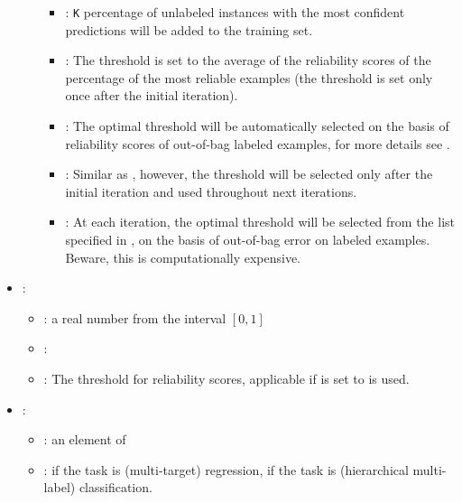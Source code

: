 \begin{itemize}
\begin{itemize}
\begin{itemize}
                    \item {}: {\tt K} percentage of unlabeled instances with the most confident predictions will be added to the training set.
                    \item {}: The threshold is set to the average of the reliability scores of the  percentage of the most reliable examples (the threshold is set only once after the initial iteration).
                    \item {}: The optimal threshold will be automatically selected on the basis of reliability scores of out-of-bag labeled examples, for more details see \cite{levatic2017_self-training}.
                    \item {}: Similar as , however, the threshold will be selected only after the initial iteration and used throughout next iterations.
                    \item {}: At each iteration, the optimal threshold will be selected from the list specified in , on the basis of out-of-bag error on labeled examples. Beware, this is computationally expensive. 
                \end{itemize}
           \end{itemize}
    \item {}:
           \begin{itemize}
                \item \optionPossibleValues{}: a real number from the interval $[0, 1]$
                \item \optionDefaultValue{}: 
                \item \optionDescrption{}: The threshold for reliability scores, applicable if  is set to  is used.
           \end{itemize}
    \item {}:
           \begin{itemize}
                \item \optionPossibleValues{}: an element of 
                \item \optionDefaultValue{}:  if the task is (multi-target) regression,  if the task is (hierarchical multi-label) classification.

\end{itemize}
\end{itemize}
